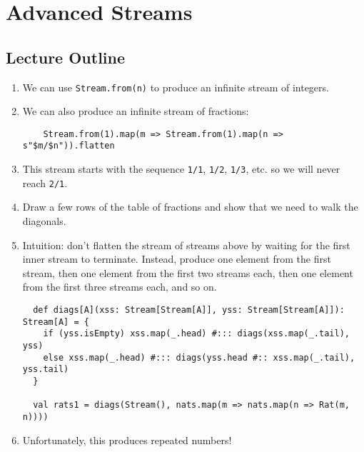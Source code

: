 \chapter{Advanced Streams}
\startlecture

\begin{instructor}

  \section*{Lecture Outline}

  \begin{enumerate}

  \item We can use \lstinline|Stream.from(n)| to produce an infinite stream of integers.

  \item We can also produce an infinite stream of fractions:

    \begin{lstlisting}
    Stream.from(1).map(m => Stream.from(1).map(n => s"$m/$n")).flatten
    \end{lstlisting}

  \item This stream starts with the sequence \lstinline|1/1|, \lstinline|1/2|, \lstinline|1/3|, etc.
    so we will never reach \lstinline|2/1|.

  \item Draw a few rows of the table of fractions and show that we need to walk the diagonals.

  \item Intuition: don't flatten the stream of streams above by waiting for the first inner stream
    to terminate. Instead, produce one element from the first stream, then one element from the
    first two streams each, then one element from the first three streams each, and so on.

    \begin{lstlisting}
  def diags[A](xss: Stream[Stream[A]], yss: Stream[Stream[A]]): Stream[A] = {
    if (yss.isEmpty) xss.map(_.head) #::: diags(xss.map(_.tail), yss)
    else xss.map(_.head) #::: diags(yss.head #:: xss.map(_.tail), yss.tail)
  }

  val rats1 = diags(Stream(), nats.map(m => nats.map(n => Rat(m, n))))
    \end{lstlisting}

  \item Unfortunately, this produces repeated numbers!


\end{enumerate}
\end{instructor}
